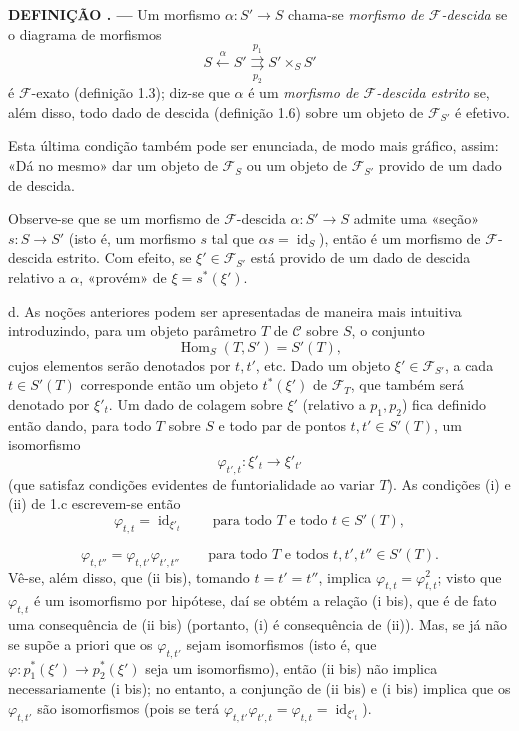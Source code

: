 \documentclass[11pt,twoside,openany]{book}
\numberwithin{equation}{section}
\newcommand{\src}[1]{%
  \phantomsection\hypertarget{src:#1}{}%
  \marginpar{\raggedleft\footnotesize\sffamily #1}%
}
\theoremstyle{plain}
\theoremstyle{definition}
\theoremstyle{remark}
\newcommand{\result}[2]{%
  \par\medskip\noindent\textbf{#1%
  \if\relax\detokenize{#2}\relax\else\space#2\fi. ---}\enspace
}
\newcommand{\FgaUnitKey}{frontmatter}
\renewcommand{\src}[1]{%
  \phantomsection\hypertarget{src:\FgaUnitKey:#1}{}%
  \marginpar{\raggedleft\footnotesize\sffamily #1}%
}
\begin{document}
\result{DEFINIÇÃO}{1.7} Um morfismo $\alpha:S'\longrightarrow S$ chama-se
\emph{morfismo de $\mathcal F$-descida} se o diagrama de morfismos
\[
  S\xleftarrow{\alpha}S'
  \overset{p_1}{\underset{p_2}{\rightrightarrows}}S'\times_S S'
\]
é $\mathcal F$-exato (definição 1.3); diz-se que $\alpha$ é um
\emph{morfismo de $\mathcal F$-descida estrito} se, além disso, todo dado de
descida (definição 1.6) sobre um objeto de $\mathcal F_{S'}$ é efetivo.

Esta última condição também pode ser enunciada, de modo mais gráfico, assim:
«Dá no mesmo» dar um objeto de $\mathcal F_S$ ou um objeto de
$\mathcal F_{S'}$ provido de um dado de descida.

Observe-se que se um morfismo de $\mathcal F$-descida
$\alpha:S'\longrightarrow S$ admite uma «seção»
$s:S\longrightarrow S'$ (isto é, um morfismo $s$ tal que
$\alpha s=\operatorname{id}_S$), então é um morfismo de
$\mathcal F$-descida estrito. Com efeito, se $\xi'\in\mathcal F_{S'}$ está provido de
um dado de descida relativo a $\alpha$, «provém» de
$\xi=s^*(\xi')$.

\medskip\noindent
d. As noções anteriores podem ser apresentadas de maneira mais intuitiva
introduzindo, para um objeto parâmetro $T$ de $\mathcal C$ sobre $S$, o
conjunto
\[
  \operatorname{Hom}_S(T,S')=S'(T),
\]
cujos elementos serão denotados por $t,t'$, etc. Dado um objeto
$\xi'\in\mathcal F_{S'}$, a cada $t\in S'(T)$ corresponde então um objeto
$t^*(\xi')$ de $\mathcal F_T$, que também será denotado por $\xi'_t$. Um dado de
colagem sobre $\xi'$ (relativo a $p_1,p_2$) fica definido então dando, para
todo $T$ sobre $S$ e todo par de pontos $t,t'\in S'(T)$, um isomorfismo
\[
  \varphi_{t',t}:\xi'_t\longrightarrow\xi'_{t'}
\]
(que satisfaz condições evidentes de funtorialidade ao variar $T$). As
condições (i) e (ii) de 1.c escrevem-se então
\[
  \tag{i bis}
  \varphi_{t,t}=\operatorname{id}_{\xi'_t}
  \qquad\text{para todo $T$ e todo $t\in S'(T)$},
\]

\src{304}
\[
  \tag{ii bis}
  \varphi_{t,t''}=\varphi_{t,t'}\varphi_{t',t''}
  \qquad\text{para todo $T$ e todos $t,t',t''\in S'(T)$}.
\]
Vê-se, além disso, que (ii bis), tomando $t=t'=t''$, implica
$\varphi_{t,t}=\varphi_{t,t}^2$; visto que $\varphi_{t,t}$ é um isomorfismo
por hipótese, daí se obtém a relação (i bis), que é de fato uma consequência
de (ii bis) (portanto, (i) é consequência de (ii)). Mas, se já não se supõe
a priori que os $\varphi_{t,t'}$ sejam isomorfismos (isto é, que
$\varphi:p_1^*(\xi')\longrightarrow p_2^*(\xi')$ seja um isomorfismo), então
(ii bis) não implica necessariamente (i bis); no entanto, a conjunção de
(ii bis) e (i bis) implica que os $\varphi_{t,t'}$ são isomorfismos (pois se
terá
$\varphi_{t,t'}\varphi_{t',t}=\varphi_{t,t}=\operatorname{id}_{\xi'_t}$).
\end{document}
